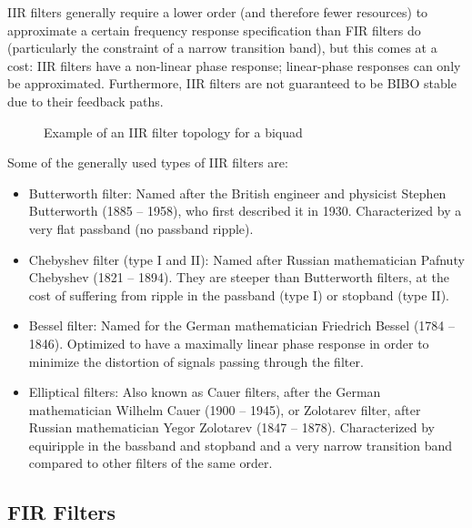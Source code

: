 IIR filters generally require a lower order (and therefore fewer resources) to
approximate a  certain frequency  response specification  than FIR  filters do
(particularly the constraint of a narrow transition band), but this comes at a
cost:  IIR  filters have a  non-linear phase response;  linear-phase responses
can only  be approximated. Furthermore, IIR  filters are not guaranteed  to be
BIBO stable due to their feedback paths.

\begin{figure}
    \centering
    
    \caption[IIR Filter: Biquad]{Example of an IIR filter topology for a biquad}
    \label{fig:filtertopologies:iir}
\end{figure}

Some of the generally used types of IIR filters are:
\begin{itemize}\tightlist
    \item
        Butterworth  filter: Named after  the British  engineer and  physicist
        Stephen  Butterworth  (1885  --  1958),  who  first  described  it  in
        1930. Characterized by a very flat passband (no passband ripple).
    \item
        Chebyshev filter  (type I  and II): Named after  Russian mathematician
        Pafnuty Chebyshev  (1821 --  1894). They are steeper  than Butterworth
        filters, at the cost of suffering from ripple in the passband (type I)
        or stopband (type II).
    \item
        Bessel  filter: Named for  the German  mathematician Friedrich  Bessel
        (1784 -- 1846). Optimized to have a maximally linear phase response in
        order  to  minimize the  distortion  of  signals passing  through  the
        filter.
    \item
        Elliptical  filters: Also known  as  Cauer filters,  after the  German
        mathematician Wilhelm Cauer (1900 -- 1945), or Zolotarev filter, after
        Russian mathematician Yegor Zolotarev (1847 -- 1878). Characterized by
        equiripple in the  bassband and stopband and a  very narrow transition
        band compared to other filters of the same order.
\end{itemize}

%
%
\subsection{FIR Filters} %
\label{subsec:FIR_filters}

